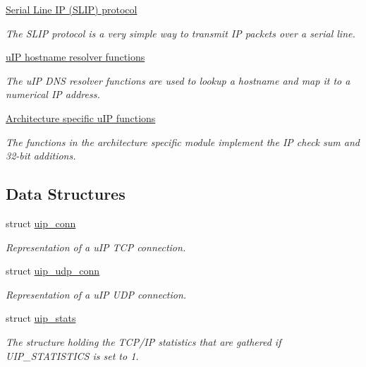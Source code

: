 \begin{CompactItemize}
\item 
\hyperlink{a00068}{Serial Line IP (SLIP) protocol}
\begin{CompactList}\small\item\em The SLIP protocol is a very simple way to transmit IP packets over a serial line. \item\end{CompactList}

\item 
\hyperlink{a00083}{u\-IP hostname resolver functions}
\begin{CompactList}\small\item\em The u\-IP DNS resolver functions are used to lookup a hostname and map it to a numerical IP address. \item\end{CompactList}

\item 
\hyperlink{a00066}{Architecture specific u\-IP functions}
\begin{CompactList}\small\item\em The functions in the architecture specific module implement the IP check sum and 32-bit additions. \item\end{CompactList}

\end{CompactItemize}
\subsection*{Data Structures}
\begin{CompactItemize}
\item 
struct \hyperlink{a00028}{uip\_\-conn}
\begin{CompactList}\small\item\em Representation of a u\-IP TCP connection. \item\end{CompactList}\item 
struct \hyperlink{a00032}{uip\_\-udp\_\-conn}
\begin{CompactList}\small\item\em Representation of a u\-IP UDP connection. \item\end{CompactList}\item 
struct \hyperlink{a00031}{uip\_\-stats}
\begin{CompactList}\small\item\em The structure holding the TCP/IP statistics that are gathered if UIP\_\-STATISTICS is set to 1. \item\end{CompactList}\end{CompactItemize}
